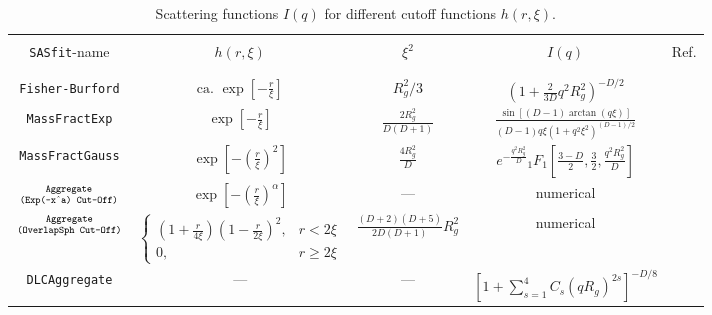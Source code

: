 \noindent

\begin{table}[htb]
\caption{Scattering functions $I(q)$ for different cutoff functions
$h(r,\xi)$.
\label{tab:SQ_cutuofffunctions}}
\begin{tabular}{|c|c|c|c|c|}
  \hline
  & & & & \\[-2mm]
  {\tt SASfit}-name & $h(r,\xi)$    & $\xi^2$   & $I(q)$    & Ref. \\
  & & & & \\[-2mm]
  \hline
  \hline
  & & & & \\[-2mm]
   {\tt \scriptsize Fisher-Burford}&  $\scriptstyle \text{ca. } \exp\left[-\tfrac{r}{\xi}\right]$  & $\scriptstyle R_g^2/3$ & $\scriptstyle \left(1+\frac{2}{3D}q^2R_g^2\right)^{-D/2}$ &  \cite{Fisher1967}\\[3mm]
   {\tt \scriptsize MassFractExp}   & $\scriptstyle \exp\left[-\tfrac{r}{\xi}\right]$          & $\frac{2R_g^2}{D(D+1)}$ & $\scriptstyle \frac{\sin\left[(D-1)\arctan(q\xi)\right]}{(D-1)q\xi(1+q^2\xi^2)^{(D-1)/2}}$ &  \cite{Sorensen1999}\\[3mm]
   {\tt \scriptsize MassFractGauss} & $\scriptstyle \exp\left[-\left(\tfrac{r}{\xi}\right)^2\right]$ & $\frac{4R_g^2}{D}$ & $\scriptstyle e^{-\frac{q^2R_g^2}{D}} {}_1F_1\left[\frac{3-D}{2},\frac{3}{2},\frac{q^2R_g^2}{D}\right]$ &  \cite{Sorensen1992}\\[3mm]
   $\text{\tt \scriptsize Aggregate}\atop \text{\tt (Exp(-x$\hat~$a) Cut-Off)}$ & $\scriptstyle \exp\left[-\left(\tfrac{r}{\xi}\right)^\alpha\right]$ & --- & numerical &  \cite{Sorensen2001}\\[3mm]
   $\text{\tt \scriptsize Aggregate}\atop \text{\tt (OverlapSph Cut-Off)}$ & $ \scriptstyle
                                                    \begin{cases}\scriptstyle
                                                        \left(1+\tfrac{r}{4\xi}\right) \left(1-\tfrac{r}{2\xi}\right)^2 ,&  \scriptstyle r<2\xi\\
                                                        \scriptstyle 0 ,&  \scriptstyle r\geq 2\xi
                                                  \end{cases}$ & $\scriptstyle\frac{(D+2)(D+5)}{2D(D+1)}R_g^2$ & numerical &  \cite{Hurd1988}\\[3mm]
   {\tt \scriptsize DLCAggregate} & --- & --- & $\scriptstyle \left[1+{\displaystyle \sum_{\scriptstyle s=1}^{\scriptstyle 4}}C_s(qR_g)^{2s}\right]^{-D/8}$ &  \cite{Lin1990c}\\

\end{tabular}
\end{table}
